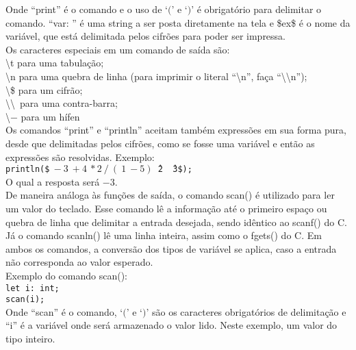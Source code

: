 \documentclass[12pt,a4paper]{article}
\begin{document}
Onde ``print'' é o comando e o uso de `$($' e `$)$' é obrigatório para delimitar o comando. ``var: '' é uma string a ser posta diretamente na tela e \$ex\$ é o nome da variável, que está delimitada pelos cifrões para poder ser impressa.\\

Os caracteres especiais em um comando de saída são:\\[0.2cm]
\textbackslash t para uma tabulação; \\
\textbackslash n para uma quebra de linha (para imprimir o literal ``\textbackslash n'', faça ``\textbackslash \textbackslash n'');\\
\textbackslash \$ para um cifrão; \\
\textbackslash \textbackslash\ para uma contra-barra; \\
\textbackslash $-$ para um hífen\\

Os comandos ``print'' e ``println'' aceitam também expressões em sua forma pura, desde que delimitadas pelos cifrões, como se fosse uma variável e então as expressões são resolvidas. Exemplo: \\

\texttt{println(\$$\ -3\ +4\ *2\ /\ (\ 1\ - 5)$\^\ 2 \^\ 3\$);}\\

O qual a resposta será $-3$.\\

De maneira análoga às funções de saída, o comando scan() é utilizado para ler um valor do teclado. Esse comando lê a informação até o primeiro espaço ou quebra de linha que delimitar a entrada desejada, sendo idêntico ao scanf() do C. Já o comando scanln() lê uma linha inteira, assim como o fgets() do C. Em ambos os comandos, a conversão dos tipos de variável se aplica, caso a entrada não corresponda ao valor esperado.\\

Exemplo do comando scan(): \\

\texttt{\noindent let i: int;\\
\indent scan(i);}\\

Onde ``scan'' é o comando, `$($' e `$)$' são os caracteres obrigatórios de delimitação e ``i'' é a variável onde será armazenado o valor lido. Neste exemplo, um valor do tipo inteiro.\\[0.3cm]

\end{document}
